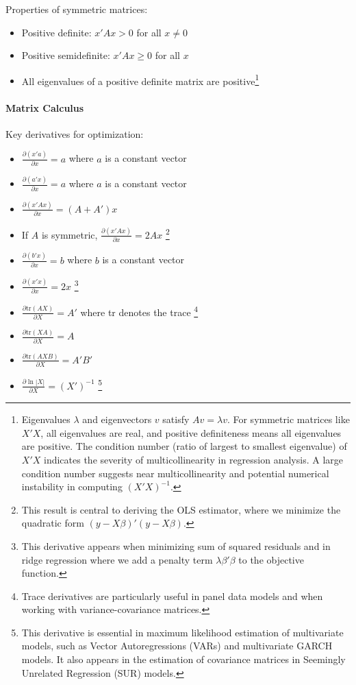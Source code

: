 Properties of symmetric matrices:
\begin{itemize}
    \item Positive definite: \(x'Ax > 0\) for all \(x \neq 0\)
    \item Positive semidefinite: \(x'Ax \geq 0\) for all \(x\)
    \item All eigenvalues of a positive definite matrix are positive\footnote{Eigenvalues \(\lambda\) and eigenvectors \(v\) satisfy \(Av = \lambda v\). For symmetric matrices like \(X'X\), all eigenvalues are real, and positive definiteness means all eigenvalues are positive. The condition number (ratio of largest to smallest eigenvalue) of \(X'X\) indicates the severity of multicollinearity in regression analysis. A large condition number suggests near multicollinearity and potential numerical instability in computing \((X'X)^{-1}\).}
\end{itemize}

\paragraph{Matrix Calculus}
Key derivatives for optimization:
\begin{itemize}
   \item \(\frac{\partial(x'a)}{\partial x} = a\) where \(a\) is a constant vector
   \item \(\frac{\partial(a'x)}{\partial x} = a\) where \(a\) is a constant vector
   \item \(\frac{\partial(x'Ax)}{\partial x} = (A + A')x\)
   \item If \(A\) is symmetric, \(\frac{\partial(x'Ax)}{\partial x} = 2Ax\) \footnote{This result is central to deriving the OLS estimator, where we minimize the quadratic form \((y-X\beta)'(y-X\beta)\).}
   \item \(\frac{\partial(b'x)}{\partial x} = b\) where \(b\) is a constant vector
   \item \(\frac{\partial(x'x)}{\partial x} = 2x\) \footnote{This derivative appears when minimizing sum of squared residuals and in ridge regression where we add a penalty term \(\lambda\beta'\beta\) to the objective function.}
   \item \(\frac{\partial \text{tr}(AX)}{\partial X} = A'\) where tr denotes the trace \footnote{Trace derivatives are particularly useful in panel data models and when working with variance-covariance matrices.}
   \item \(\frac{\partial \text{tr}(XA)}{\partial X} = A\)
   \item \(\frac{\partial \text{tr}(AXB)}{\partial X} = A'B'\)
   \item \(\frac{\partial \ln|X|}{\partial X} = (X')^{-1}\) \footnote{This derivative is essential in maximum likelihood estimation of multivariate models, such as Vector Autoregressions (VARs) and multivariate GARCH models. It also appears in the estimation of covariance matrices in Seemingly Unrelated Regression (SUR) models.}
\end{itemize}

